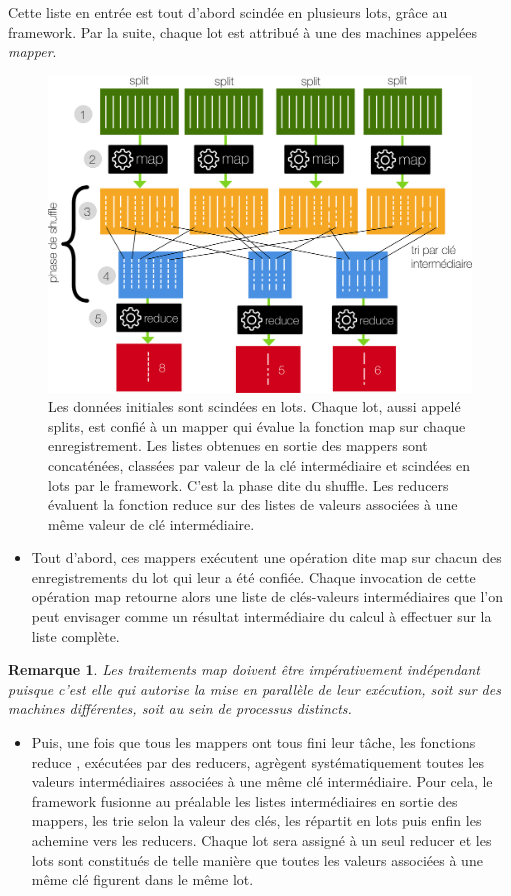 \documentclass[12pt]{article}
\newtheorem*{req}{Remarque}
\begin{document}
Cette liste en entrée est tout d'abord scindée en plusieurs lots, grâce au framework. Par la suite, chaque lot est attribué à une des machines appelées \emph{mapper}.
\begin{figure}[H]
\centering
\includegraphics[width=1\textwidth]{mr}
\caption{Les données initiales sont scindées en lots. Chaque lot, aussi appelé splits, est confié à un mapper qui évalue la fonction map sur chaque enregistrement. Les listes obtenues en sortie des mappers sont concaténées, classées par valeur de la clé intermédiaire et scindées en lots par le framework. C'est la phase dite du shuffle. Les reducers évaluent la fonction reduce sur des listes de valeurs associées à une même valeur de clé intermédiaire.}
\end{figure}
\begin{itemize}
\item Tout d'abord, ces mappers exécutent une opération dite \og map \fg  sur chacun des enregistrements du lot qui leur a été confiée. Chaque invocation de cette opération map retourne alors une liste de clés-valeurs intermédiaires que l'on peut envisager comme un résultat intermédiaire du calcul à effectuer sur la liste complète.
\end{itemize}
\begin{req}
Les traitements map doivent être impérativement indépendant puisque c'est elle qui autorise la mise en parallèle de leur exécution, soit sur des machines différentes, soit au sein de processus distincts.
\end{req}
\begin{itemize}
\item Puis, une fois que tous les mappers ont tous fini leur tâche, les fonctions \og reduce \fg , exécutées par des reducers, agrègent systématiquement toutes les valeurs intermédiaires associées à une même clé intermédiaire. Pour cela, le framework fusionne au préalable les listes intermédiaires en sortie des mappers, les trie selon la valeur des clés, les répartit en lots puis enfin les achemine vers les reducers. Chaque lot sera assigné à un seul reducer et les lots sont constitués de telle manière que  toutes les valeurs associées à une même clé figurent dans le même lot.
\end{itemize}
\end{document}
